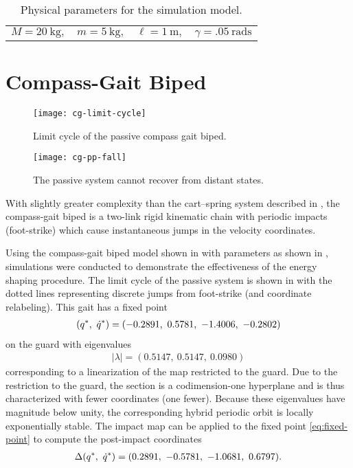 \begin{table}[t]
  \caption{Physical parameters for the simulation model.}
  \label{tab:mparam}
  \centering
  \begin{tabular}{c c c c}
    $M =20 \ \mathrm{kg},$ &
    $m = 5 \ \mathrm{kg},$ &
    $\ell = 1 \ \mathrm{m},$ &
    $\gamma = .05 \ \mathrm{rads}$
  \end{tabular}
  \vspace{-1em}
\end{table}

\section{Compass-Gait Biped} \label{sec:simulations-compass-gait}

\begin{figure}[p!]
  \centering
  \texttt{[image: cg-limit-cycle]}
  \caption{Limit cycle of the passive compass gait biped.}
  \label{fig:lc}
\end{figure}

\begin{figure}[p!]
  \centering
  \texttt{[image: cg-pp-fall]}
  \caption{The passive system cannot recover from distant states.}
  \label{fig:pp-fall}
\end{figure}

With slightly greater complexity than the cart--spring system described in
, the compass-gait biped is a two-link rigid kinematic
chain with periodic impacts (foot-strike) which cause instantaneous jumps in the
velocity coordinates.

Using the compass-gait biped model shown in  with
parameters as shown in , simulations were conducted to
demonstrate the effectiveness of the energy shaping procedure.
% 
The limit cycle of the passive system is shown in  with the
dotted lines representing discrete jumps from foot-strike (and coordinate
relabeling).
% 
This gait has a fixed point
% 
\begin{align}
  \label{eq:fixed-point}
  (q^{*}, \ \dot{q}^{*}) = (-0.2891, \ 0.5781, \ -1.4006, \ -0.2802)
\end{align}
% 
on the guard with eigenvalues
% 
\begin{align}
  |\lambda| = (0.5147, \ 0.5147, \ 0.0980)
\end{align}
% 
corresponding to a linearization of the \Poincare{} map restricted to the guard.
% 
Due to the restriction to the guard, the \Poincare{} section is a
codimension-one hyperplane and is thus characterized with fewer coordinates (one
fewer).
% 
Because these eigenvalues have magnitude below unity, the corresponding hybrid
periodic orbit is locally exponentially stable.
% 
The impact map can be applied to the fixed point \eqref{eq:fixed-point} to
compute the post-impact coordinates
% 
\begin{align}
  \label{eq:fixed-point-post-impact}
  \Delta(q^{*}, \ \dot{q}^{*}) = (0.2891, \ -0.5781, \ -1.0681, \ 0.6797).
\end{align}


